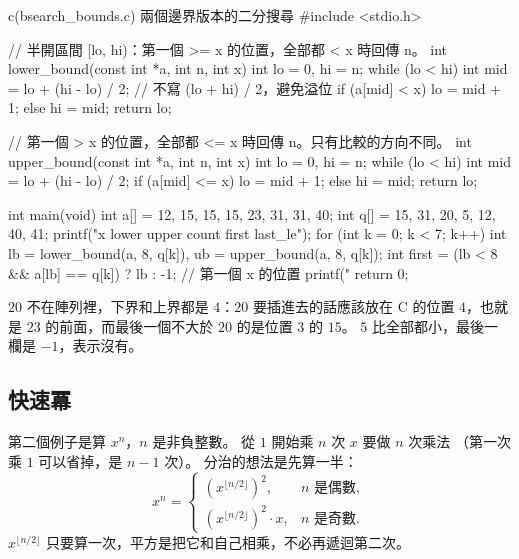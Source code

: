 \begin{example}[label=ex:dc-bsearch]{c}{(bsearch\_bounds.c) 兩個邊界版本的二分搜尋}
#include <stdio.h>

// 半開區間 [lo, hi)：第一個 >= x 的位置，全部都 < x 時回傳 n。
int lower_bound(const int *a, int n, int x)
{
    int lo = 0, hi = n;
    while (lo < hi) {
        int mid = lo + (hi - lo) / 2;      // 不寫 (lo + hi) / 2，避免溢位
        if (a[mid] < x) {
            lo = mid + 1;
        } else {
            hi = mid;
        }
    }
    return lo;
}

// 第一個 > x 的位置，全部都 <= x 時回傳 n。只有比較的方向不同。
int upper_bound(const int *a, int n, int x)
{
    int lo = 0, hi = n;
    while (lo < hi) {
        int mid = lo + (hi - lo) / 2;
        if (a[mid] <= x) {
            lo = mid + 1;
        } else {
            hi = mid;
        }
    }
    return lo;
}

int main(void)
{
    int a[] = {12, 15, 15, 15, 23, 31, 31, 40};
    int q[] = {15, 31, 20, 5, 12, 40, 41};
    printf("x lower upper count first last_le\n");
    for (int k = 0; k < 7; k++) {
        int lb = lower_bound(a, 8, q[k]), ub = upper_bound(a, 8, q[k]);
        int first = (lb < 8 && a[lb] == q[k]) ? lb : -1;    // 第一個 x 的位置
        printf("%
    }
    return 0;
}
\end{example}

$20$ 不在陣列裡，下界和上界都是 $4$：$20$ 要插進去的話應該放在 C 的位置 $4$，也就
是 $23$ 的前面，而最後一個不大於 $20$ 的是位置 $3$ 的 $15$。 $5$ 比全部都小，最後一
欄是 $-1$，表示沒有。

\subsection{快速冪}
\label{sec:dc-power}

第二個例子是算 $x^n$，$n$ 是非負整數。 從 $1$ 開始乘 $n$ 次 $x$ 要做 $n$ 次乘法
（第一次乘 $1$ 可以省掉，是 $n - 1$ 次）。 分治的想法是先算一半：
\[
x^n = \begin{cases}
\left(x^{\lfloor n/2 \rfloor}\right)^2, & n \text{ 是偶數}, \\[2pt]
\left(x^{\lfloor n/2 \rfloor}\right)^2 \cdot x, & n \text{ 是奇數}.
\end{cases}
\]
$x^{\lfloor n/2 \rfloor}$ 只要算一次，平方是把它和自己相乘，不必再遞迴第二次。

